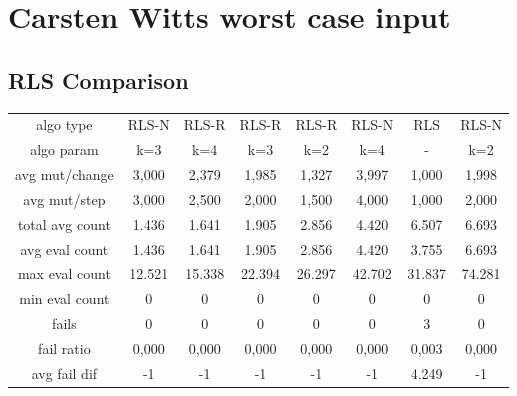 \section{Carsten Witts worst case input}

\subsection{RLS Comparison}

\begin{tabular}[h]{cccccccc}
algo type&         RLS-N&  RLS-R&  RLS-R&  RLS-R&  RLS-N&    RLS&  RLS-N\\
algo param&          k=3&    k=4&    k=3&    k=2&    k=4&      -&    k=2\\
avg mut/change&    3,000&  2,379&  1,985&  1,327&  3,997&  1,000&  1,998\\
avg mut/step&      3,000&  2,500&  2,000&  1,500&  4,000&  1,000&  2,000\\
\hline
total avg count&   1.436&  1.641&  1.905&  2.856&  4.420&  6.507&  6.693\\
avg eval count&    1.436&  1.641&  1.905&  2.856&  4.420&  3.755&  6.693\\
max eval count&   12.521& 15.338& 22.394& 26.297& 42.702& 31.837& 74.281\\
min eval count&        0&      0&      0&      0&      0&      0&      0\\
\hline
fails&                 0&      0&      0&      0&      0&      3&      0\\
fail ratio&        0,000&  0,000&  0,000&  0,000&  0,000&  0,003&  0,000\\
avg fail dif&         -1&     -1&     -1&     -1&     -1&  4.249&     -1\\
\end{tabular}

